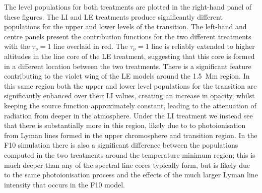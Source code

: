 The level populations for both treatments are plotted in the right-hand panel of these figures.
The LI and LE treatments produce significantly different populations for the upper and lower levels of the \CaLine{} transition.
The left-hand and centre panels present the contribution functions for the two different treatments with the $\tau_\nu=1$ line overlaid in red.
The $\tau_\nu=1$ line is reliably extended to higher altitudes in the line core of the LE treatment, suggesting that this core is formed in a different location between the two treatments.
There is a significant feature contributing to the violet wing of the LE models around the \SI{1.5}{\mega\metre} region.
In this same region both the upper and lower level populations for the \CaLine{} transition are significantly enhanced over their LI values, creating an increase in opacity, whilst keeping the source function approximately constant, leading to the attenuation of radiation from deeper in the atmosphere.
Under the LI treatment we instead see that there is substantially more \Caiii{} in this region, likely due to \Caii{} to \Caiii{} photoionisation from Lyman lines formed in the upper chromosphere and transition region.
In the F10 simulation there is also a significant difference between the \Caiii{} populations computed in the two treatments around the temperature minimum region; this is much deeper than any of the \Caii{} spectral line cores typically form, but is likely due to the same photoionisation process and the effects of the much larger Lyman line intensity that occurs in the F10 model.


